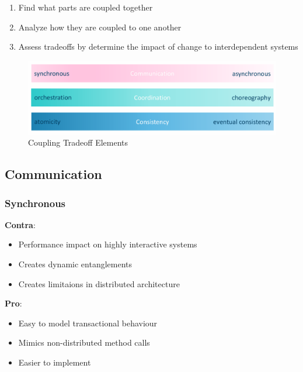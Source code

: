 \documentclass[../Main.tex]{subfiles}
\begin{document}
\begin{enumerate}
    \item Find what parts are coupled together
    \item Analyze how they are coupled to one another
    \item Assess tradeoffs by determine the impact of change to interdependent systems
\end{enumerate}

\newpage
\begin{figure}[H]
    \centering
    \includegraphics[width=1\linewidth]{Images/coupling-elements.png}
    \caption{Coupling Tradeoff Elements}
\end{figure}

\subsection{Communication}
\subsubsection{Synchronous}

\begin{multicols}{2}
    \textbf{Contra}:
    \begin{itemize}
        \item Performance impact on highly interactive systems
        \item Creates dynamic entanglements
        \item Creates limitaions in distributed architecture
    \end{itemize}
    \columnbreak
    \textbf{Pro}:
    \begin{itemize}
        \item Easy to model transactional behaviour
        \item Mimics non-distributed method calls
        \item Easier to implement
    \end{itemize}
\end{multicols}
\end{document}
